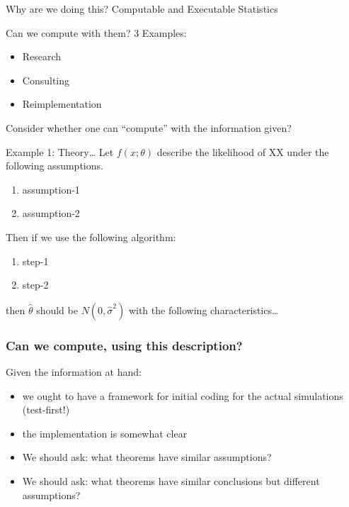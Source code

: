 \documentclass{beamer}
\begin{document}
\begin{frame}{Why are we doing this?}
    Computable and Executable Statistics
\end{frame}

\begin{frame}{Can we compute with them?}
  3 Examples:
  \begin{itemize}
  \item Research
  \item Consulting
  \item Reimplementation
  \end{itemize}
  Consider whether one can ``compute'' with the information given?
\end{frame}

\begin{frame}[fragile]{Example 1: Theory\ldots}
  \label{example1}
  Let $f(x;\theta)$ describe the likelihood of XX under the following
  assumptions.  
  \begin{enumerate}
  \item assumption-1
  \item assumption-2
  \end{enumerate}
  Then if we use the following algorithm:
  \begin{enumerate}
  \item step-1
  \item step-2
  \end{enumerate}
  then $\hat{\theta}$ should be $N(0,\hat\sigma^2)$ with the following
  characteristics\ldots
\end{frame}

\begin{frame}
  \frametitle{Can we compute, using this description?}
  Given the information at hand:
  \begin{itemize}
  \item we ought to have a framework for initial coding for the
    actual simulations (test-first!)
  \item the implementation is somewhat clear
  \item We should ask: what theorems have similar assumptions?
  \item We should ask: what theorems have similar conclusions but
    different assumptions?
  \end{itemize}
\end{frame}
\end{document}
